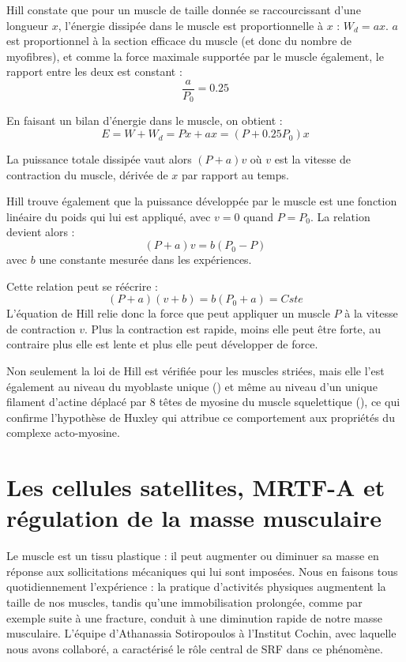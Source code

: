 \documentclass{report}
\begin{document}
Hill constate que pour un muscle de taille donnée se raccourcissant d'une longueur $x$, l'énergie dissipée dans le muscle est proportionnelle à $x$ : $W_d=ax$. $a$ est proportionnel à la section efficace du muscle (et donc du nombre de myofibres), et comme la force maximale supportée par le muscle également, le rapport entre les deux  est constant : $$\frac{a}{P_0}=0.25$$

En faisant un bilan d'énergie dans le muscle, on obtient : 
$$ E=W+W_d=Px+ax=(P+0.25P_0)x$$

La puissance totale dissipée vaut alors $(P+a)v$ où $v$ est la vitesse de contraction du muscle, dérivée de $x$ par rapport au temps. 

Hill trouve également que la puissance développée par le muscle est une fonction linéaire du poids qui lui est appliqué, avec $v=0$ quand $P=P_0$. 
La relation devient alors : 
$$ (P+a)v=b(P_0-P)$$
avec $b$ une constante mesurée dans les expériences. 

Cette relation peut se réécrire : 
\begin{equation}
\label{Hill}
(P+a)(v+b)=b(P_0+a)=Cste
\end{equation}
L'équation de Hill relie donc la force que peut appliquer un muscle $P$ à la vitesse de contraction $v$. Plus la contraction est rapide, moins elle peut être forte, au contraire plus elle est lente et plus elle peut développer de force. 

Non seulement la loi de Hill est vérifiée pour les muscles striées, mais elle l'est également au niveau du myoblaste unique (\cite{mitrossilis_single-cell_2009}) et même au niveau d'un unique filament d'actine déplacé par 8 têtes de myosine du muscle squelettique (\cite{debold_slip_2005}), ce qui confirme l'hypothèse de Huxley qui attribue ce comportement aux propriétés du complexe acto-myosine. 

\section{Les cellules satellites, MRTF-A et régulation de la masse musculaire}

Le muscle est un tissu plastique : il peut augmenter ou diminuer sa masse en réponse aux sollicitations mécaniques qui lui sont imposées. Nous en faisons tous quotidiennement l'expérience : la pratique d'activités physiques augmentent la taille de nos muscles, tandis qu'une immobilisation prolongée, comme par exemple suite à une fracture, conduit à une diminution rapide de notre masse musculaire. L'équipe d'Athanassia Sotiropoulos à l'Institut Cochin, avec laquelle nous avons collaboré, a caractérisé le rôle central de SRF dans ce phénomène. 
\end{document}
